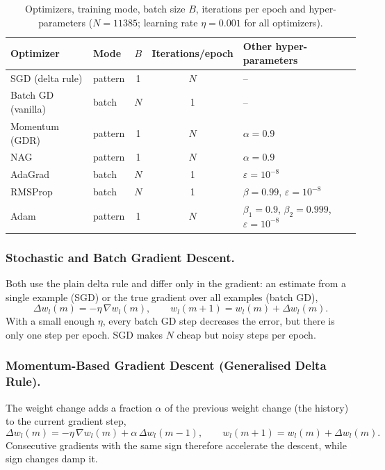 \documentclass[runningheads]{llncs}
\begin{document}
\begin{table}[!htb]
\centering
\caption{Optimizers, training mode, batch size $B$, iterations per epoch and hyper-parameters
($N=11385$; learning rate $\eta=0.001$ for all optimizers).}\label{tab:opt}
\setlength{\tabcolsep}{3.8pt}
\begin{tabular}{llccl}
\toprule
Optimizer & Mode & $B$ & Iterations/epoch & Other hyper-parameters \\
\midrule
SGD (delta rule)   & pattern & 1   & $N$ & -- \\
Batch GD (vanilla) & batch   & $N$ & 1   & -- \\
Momentum (GDR)     & pattern & 1   & $N$ & $\alpha=0.9$ \\
NAG                & pattern & 1   & $N$ & $\alpha=0.9$ \\
AdaGrad            & batch   & $N$ & 1   & $\varepsilon=10^{-8}$ \\
RMSProp            & batch   & $N$ & 1   & $\beta=0.99$, $\varepsilon=10^{-8}$ \\
Adam               & pattern & 1   & $N$ & $\beta_1=0.9$, $\beta_2=0.999$, $\varepsilon=10^{-8}$ \\
\bottomrule
\end{tabular}
\end{table}

\subsubsection{Stochastic and Batch Gradient Descent.}
Both use the plain delta rule and differ only in the gradient: an estimate from a single example
(SGD) or the true gradient over all examples (batch GD),
\begin{equation}
\Delta w_l(m)=-\eta\,\nabla w_l(m),\qquad w_l(m+1)=w_l(m)+\Delta w_l(m).
\end{equation}
With a small enough $\eta$, every batch GD step decreases the error, but there is only one step
per epoch. SGD makes $N$ cheap but noisy steps per epoch.

\subsubsection{Momentum-Based Gradient Descent (Generalised Delta Rule).}
The weight change adds a fraction $\alpha$ of the previous weight change (the history) to the current
gradient step,
\begin{equation}
\Delta w_l(m)=-\eta\,\nabla w_l(m)+\alpha\,\Delta w_l(m-1),\qquad w_l(m+1)=w_l(m)+\Delta w_l(m).
\end{equation}
Consecutive gradients with the same sign therefore accelerate the descent, while sign changes damp it.
\end{document}
